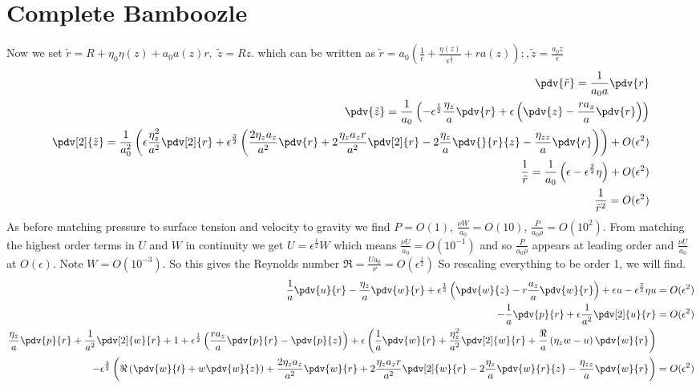 \documentclass[12pt]{article}
\newcommand{\rt}{^{\frac{1}{2}}}
\newcommand{\rtt}{^{\frac{3}{2}}}
\begin{document}
	\section{Complete Bamboozle}
	Now we set $\tilde{r} = R + \eta_0\eta(z) +a_0a(z) r,\; \tilde{z} = Rz$. which can be written as 
	$\tilde{r} =a_0(\frac{1}{\epsilon}+\frac{\eta(z)}{\epsilon\rt} + ra(z)) ;, \tilde{z} =\frac{a_0 z}{\epsilon } $
	\begin{align}
	\pdv{\tilde r } = \frac{1}{a_0a}\pdv{r}\\
	\pdv{\tilde z} = \frac{1}{a_0}\left(-\epsilon\rt\frac{\eta_z}{a}\pdv{r}+\epsilon\left(\pdv{z}-\frac{ra_z}{a}\pdv{r}\right)\right)\\
	\pdv[2]{\tilde z}= \frac{1}{a_0^2}\left(\epsilon\frac{\eta_z^2}{a^2}\pdv[2]{r}+\epsilon\rtt\left(\frac{2\eta_za_z}{a^2}\pdv{r}+2\frac{\eta_za_zr}{a^2}\pdv[2]{r}-2\frac{\eta_z}{a}\pdv{}{r}{z}-\frac{\eta_{zz}}{a}\pdv{r}\right)\right) +O(\epsilon^2)\\
	\frac{1}{\tilde r} = \frac{1}{a_0}\left(\epsilon-\epsilon\rtt\eta\right)+O(\epsilon^2)\\
		\frac{1}{\tilde r^2} = O(\epsilon^2)
	\end{align}
	As before matching pressure to surface tension and velocity to gravity we find $P=O(1)$, $\frac{\nu W}{a_0} = O(10)$, $\frac{P}{a_0\rho} = O(10^2)$. From matching the highest order terms in $U$ and $W$ in continuity we get $U=\epsilon\rt W$ which means  $\frac{\nu U}{a_0} = O(10^{-1})$ and so $\frac{P}{a_0\rho}$ appears at leading order and $\frac{\nu U}{a_0}$ at $O(\epsilon)$. Note $W = O(10^{-3}).$ So this gives the Reynolds number $\Re = \frac{Ua_0}{\nu} = O(\epsilon\rt)$ So rescaling everything to be order 1, we will find.
	\begin{align}
	\frac{1}{a}\pdv{u}{r}-\frac{\eta_z}{a}\pdv{w}{r} +\epsilon\rt\left(\pdv{w}{z}-r\frac{a_z}{a}\pdv{w}{r}\right)+\epsilon u -\epsilon\rtt\eta u &= O(\epsilon^2)\\
	-\frac{1}{a}\pdv{p}{r}+\epsilon\frac{1}{a^2}\pdv[2]{u}{r} & = O(\epsilon^2)\\
	\frac{\eta_z}{a}\pdv{p}{r}+\frac{1}{a^2}\pdv[2]{w}{r} + 1 +\epsilon\rt\left(\frac{ra_z}{a}\pdv{p}{r}-\pdv{p}{z}\right)+\epsilon\left(\frac{1}{a}\pdv{w}{r}+\frac{\eta_z^2}{a^2}\pdv[2]{w}{r}+\frac{\Re}{a}\left(\eta_z w-u\right)\pdv{w}{r}\right)&\\
	-\epsilon\rtt\left(\Re\left(\pdv{w}{t}+w\pdv{w}{z}\right)+\frac{2\eta_za_z}{a^2}\pdv{w}{r}+2\frac{\eta_za_zr}{a^2}\pdv[2]{w}{r}-2\frac{\eta_z}{a}\pdv{w}{r}{z}-\frac{\eta_{zz}}{a}\pdv{w}{r}\right)& = O(\epsilon^2)
	\end{align}
\end{document}
